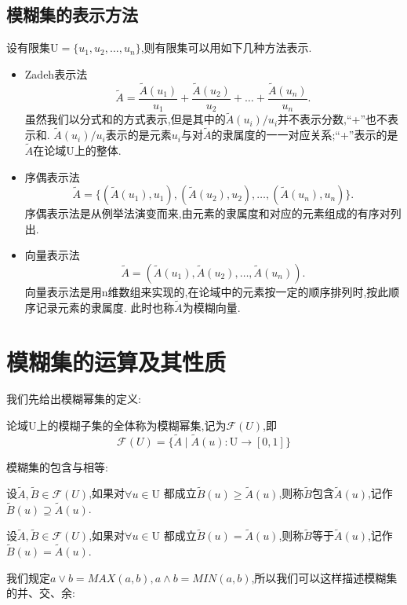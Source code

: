 \subsection{模糊集的表示方法}
设有限集$\mathrm{U}=\{u_1,u_2,\dots ,u_n\}$,则有限集可以用如下几种方法表示\cite{模糊数学李安贵}.
\begin{itemize}
    \item Zadeh表示法
          \[
              \tilde{A}=\frac{\tilde{A}(u_1)}{u_1}+\frac{\tilde{A}(u_2)}{u_2}+ \dots +\frac{\tilde{A}(u_n)}{u_n}.
          \]
          虽然我们以分式和的方式表示,但是其中的$\tilde{A}(u_i)/u_i$并不表示分数,“+”也不表示和.
          $\tilde{A}(u_i)/u_i$表示的是元素$u_i$与对$\tilde{A}$的隶属度的一一对应关系;“+”表示的是$\tilde{A}$在论域$\mathrm{U}$上的整体.\newpage
    \item 序偶表示法
          \[
              \tilde{A}=\{(\tilde{A}(u_1),u_1),(\tilde{A}(u_2),u_2),\dots ,(\tilde{A}(u_n),u_n)\}.
          \]
          序偶表示法是从例举法演变而来,由元素的隶属度和对应的元素组成的有序对列出.
    \item 向量表示法
          \[
              \tilde{A}=(\tilde{A}(u_1),\tilde{A}(u_2),\dots ,\tilde{A}(u_n)).
          \]
          向量表示法是用n维数组来实现的,在论域中的元素按一定的顺序排列时,按此顺序记录元素的隶属度.
          此时也称$\tilde{A}$为模糊向量.
\end{itemize}
\section{模糊集的运算及其性质}
我们先给出模糊幂集的定义:
\begin{definition}
    论域$\mathrm{U}$上的模糊子集的全体称为模糊幂集,记为$\mathscr{F}(U)$,即
    \[
        \mathscr{F}(U)=\{\tilde{A} \mid \tilde{A}(u):\mathrm{U} \to [0,1]\}
    \]
\end{definition}
模糊集的包含与相等:
\begin{definition}
    设$\tilde{A}, \tilde{B} \in \mathscr{F}(U)$,如果对$\forall u \in \mathrm{U}$
    都成立$\tilde{B}(u)\geqslant \tilde{A}(u)$,则称$\tilde{B}$包含$\tilde{A}(u)$,记作$\tilde{B}(u )\supseteq \tilde{A}(u)$.
\end{definition}
\begin{definition}
    设$\tilde{A}, \tilde{B} \in \mathscr{F}(U)$,如果对$\forall u \in \mathrm{U}$
    都成立$\tilde{B}(u) = \tilde{A}(u)$,则称$\tilde{B}$等于$\tilde{A}(u)$,记作$\tilde{B}(u)= \tilde{A}(u)$.
\end{definition}
我们规定$a\vee b=MAX(a,b),a\wedge b=MIN(a,b)$,所以我们可以这样描述模糊集的并、交、余:

